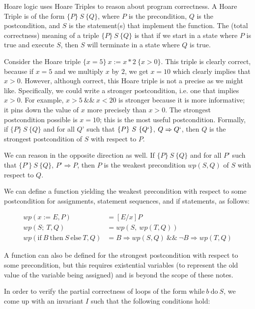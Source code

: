 \documentclass[11pt]{article}
\begin{document}
    Hoare logic uses Hoare Triples to reason about program correctness. A
    Hoare Triple is of the form $\{P\} ~S~ \{Q\}$, where $P$ is the
    precondition, $Q$ is the postcondition, and $S$ is the statement(s)
    that implement the function. The (total correctness) meaning of a
    triple $\{P\} ~S~ \{Q\}$ is that if we start in a state where $P$ is true
    and execute $S$, then $S$ will terminate in a state where $Q$ is true.

    Consider the Hoare triple $\{x = 5\} ~x := x * 2~ \{ x > 0 \}$. This triple
    is clearly correct, because if $x=5$ and we multiply $x$ by $2$, we
    get $x=10$ which clearly implies that $x>0$. However, although
    correct, this Hoare triple is not a precise as we might like.
    Specifically, we could write a stronger postcondition, i.e. one that
    implies $x>0$. For example, $x>5 ~\&\&~ x < 20$ is stronger because it is
    more informative; it pins down the value of $x$ more precisely than
    $x>0$. The strongest postcondition possible is $x=10$; this is the
    most useful postcondition. Formally, if $\{P\} ~S~ \{Q\}$ and for all $Q’$
    such that $\{P\} ~S~ \{Q`\}$, $Q \Rightarrow Q`$, then $Q$ is the strongest
    postcondition of $S$ with respect to $P$.

    We can reason in the opposite direction as well. If $\{P\} ~S~ \{Q\}$ and
    for all $P’$ such that $\{P’\} ~S~ \{Q\}$, $P’ \Rightarrow P$, then $P$ is
    the weakest precondition $wp(S,Q)$ of $S$ with respect to $Q$.

    We can define a function yielding the weakest precondition with respect to
    some postcondition for assignments, statement
    sequences, and if statements, as follows:

    \[
        \begin{array}{ll}
            wp(x := E, P) & = [E/x] P
            \\[1ex]
            wp(S;~ T, Q) & = wp(S, ~wp(T, Q))
            \\[1ex]
            wp(\mbox{if}~ B ~\mbox{then}~ S ~\mbox{else}~ T, Q) & = B \Rightarrow wp(S,Q) ~\&\&~ \lnot B \Rightarrow wp(T,Q)
        \end{array}
    \]

    A function can also be defined for the strongest postcondition with respect
    to some precondition, but this requires existential variables (to represent
    the old value of the variable being assigned) and is beyond the scope of
    these notes.

    In order to verify the partial correctness of loops of the form
    $\mbox{while}~ b ~\mbox{do}~ S$, we come up with an invariant $I$ such
    that the following conditions hold:
\end{document}
